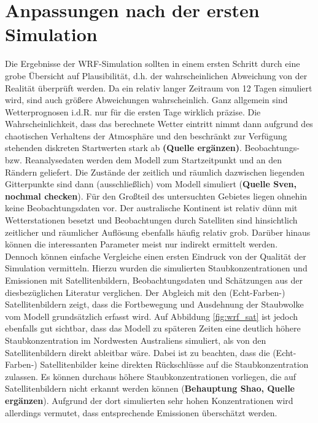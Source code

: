 \documentclass[12pt,a4paper,onecolumn,draft]{scrartcl}
\begin{document}
\section{Anpassungen nach der ersten Simulation}
Die Ergebnisse der WRF-Simulation sollten in einem ersten Schritt durch eine grobe Übersicht auf Plausibilität, d.h. der wahrscheinlichen Abweichung von der Realität überprüft werden. Da ein relativ langer Zeitraum von 12 Tagen simuliert wird, sind auch größere Abweichungen wahrscheinlich. Ganz allgemein sind Wetterprognosen i.d.R. nur für die ersten Tage wirklich präzise. Die Wahrscheinlichkeit, dass das berechnete Wetter eintritt nimmt dann aufgrund des chaotischen Verhaltens der Atmosphäre und den beschränkt zur Verfügung stehenden diskreten Startwerten stark ab \textbf{(Quelle ergänzen)}. Beobachtungs- bzw. Reanalysedaten werden dem Modell zum Startzeitpunkt und an den Rändern geliefert. Die Zustände der zeitlich und räumlich dazwischen liegenden Gitterpunkte sind dann (ausschließlich) vom Modell simuliert (\textbf{Quelle Sven, nochmal checken}). Für den Großteil des untersuchten Gebietes liegen ohnehin keine Beobachtungsdaten vor. Der australische Kontinent ist relativ dünn mit Wetterstationen besetzt und Beobachtungen durch Satelliten sind hinsichtlich  zeitlicher und räumlicher Auflösung ebenfalls häufig relativ grob. Darüber hinaus können die interessanten Parameter meist nur indirekt ermittelt werden.\\

Dennoch können einfache Vergleiche einen ersten Eindruck von der Qualität der Simulation vermitteln. Hierzu wurden die simulierten Staubkonzentrationen und Emissionen mit Satellitenbildern, Beobachtungsdaten und Schätzungen aus der diesbezüglichen Literatur verglichen. Der Abgleich mit den (Echt-Farben-) Satellitenbildern zeigt, dass die Fortbewegung und Ausdehnung der Staubwolke vom Modell grundsätzlich erfasst wird. Auf Abbildung \ref{fig:wrf_sat} ist jedoch ebenfalls gut sichtbar, dass das Modell zu späteren Zeiten eine deutlich höhere Staubkonzentration im Nordwesten Australiens simuliert, als von den Satellitenbildern direkt ableitbar wäre. Dabei ist zu beachten, dass die (Echt-Farben-) Satellitenbilder keine direkten Rückschlüsse auf die Staubkonzentration zulassen. Es können durchaus höhere Staubkonzentrationen vorliegen, die auf Satellitenbildern nicht erkannt werden können (\textbf{Behauptung Shao, Quelle ergänzen}). Aufgrund der dort simulierten sehr hohen Konzentrationen wird allerdings vermutet, dass entsprechende Emissionen überschätzt werden.
\end{document}
